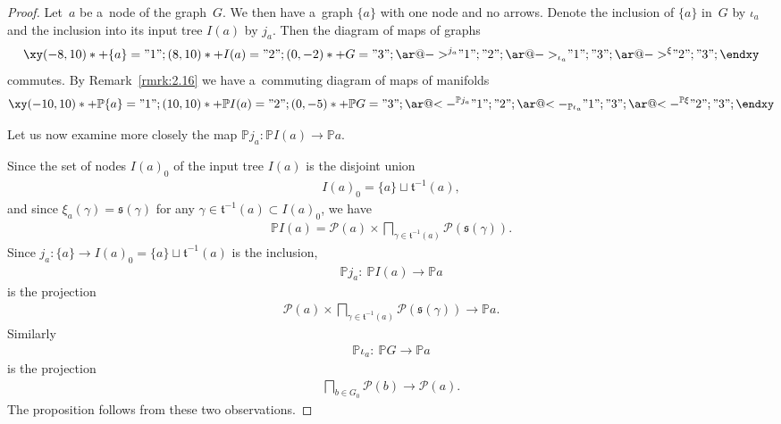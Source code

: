\documentclass[10pt,a4paper]{amsart}
\numberwithin{equation}{section}
\begin{document}
\begin{proof}
Let~$a$ be a~node of the graph~$G$.
We then have a~graph $\{a\}$ with one node and no arrows.
Denote the inclusion of $\{a\}$ in~$G$ by $\iota_a$ and the inclusion into its input tree $I(a)$ by $j_a$.
Then the diagram of maps of graphs
\begin{gather*}
\xy
(-8, 10)*+{ \{a\}} ="1";
(8, 10)*+{ I(a)} ="2";
(0, -2)*+{G}="3";
{\ar@{->}^{ j_a} "1";"2"};
{\ar@{->}_{ \iota_a} "1";"3"};
{\ar@{->}^{\xi} "2";"3"};
\endxy
\end{gather*}
commutes.
By Remark~\ref{rmrk:2.16} we have a~commuting diagram of maps of manifolds
\begin{gather*}
\xy
(-10, 10)*+{ \mathbb{P}\{a\}} ="1";
(10, 10)*+{ \mathbb{P} I(a)} ="2";
(0, -5)*+{\mathbb{P} G}="3";
{\ar@{<-}^{ \mathbb{P} j_a} "1";"2"};
{\ar@{<-}_{ \mathbb{P} \iota_a} "1";"3"};
{\ar@{<-}^{\mathbb{P} \xi} "2";"3"};
\endxy
\end{gather*}

Let us now examine more closely the map $\mathbb{P} j_a\colon \mathbb{P} I(a)\to \mathbb{P} a$.

Since the set of nodes $I(a)_0$ of the input tree $I(a)$ is the disjoint union
\begin{gather*}
I(a)_0 = \{a\} \sqcup \mathfrak t^{-1} (a),
\end{gather*}
and since $\xi_a (\gamma) = \mathfrak s (\gamma)$ for any $\gamma \in \mathfrak t^{-1} (a) \subset I(a)_0$, we have
\begin{gather*}
\mathbb{P} I(a) = {\mathcal P}(a) \times \bigsqcap_{\gamma \in \mathfrak t^{-1} (a)} {\mathcal P} (\mathfrak s(\gamma)).
\end{gather*}
Since $j_a\colon \{a\} \to I(a)_0 = \{a\} \sqcup \mathfrak t^{-1} (a)$ is the inclusion,
\begin{gather*}
\mathbb{P} j_a \colon \ \mathbb{P} I(a) \to \mathbb{P} a
\end{gather*}
is the projection
\begin{gather*}
{\mathcal P}(a) \times \bigsqcap_{\gamma \in \mathfrak t^{-1} (a)} {\mathcal P} (\mathfrak s(\gamma)) \to \mathbb{P} a.
\end{gather*}
Similarly
\begin{gather*}
\mathbb{P} \iota_a\colon \ \mathbb{P} G \to \mathbb{P} a
\end{gather*}
is the projection
\begin{gather*}
\bigsqcap_{b\in G_0} {\mathcal P} (b) \to {\mathcal P}(a).
\end{gather*}
The proposition follows from these two observations.
\end{proof}
\end{document}
